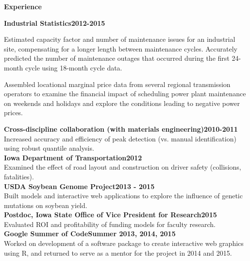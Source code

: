 \documentclass[letterpaper,12pt,final]{memoir}
\newcommand{\SmallSep}{\vspace{0.5em}}
\newcommand{\CVSection}[1]
	{\Large\textbf{#1}\par
	\SmallSep\normalsize\normalfont}
\newcommand{\CVItem}[1]
	{\textbf{\color{RoyalBlue} #1}}
\begin{document}
\CVSection{Experience}
\CVItem{Industrial Statistics\hfill 2012-2015}
\begin{compactitem}[\color{RoyalBlue}$\bullet$]\small
 \item Estimated capacity factor and number of maintenance issues for an industrial site, compensating for a longer length between maintenance cycles. Accurately predicted the number of maintenance outages that occurred during the first 24-month cycle using 18-month cycle data.
 \item Assembled locational marginal price data from several regional transmission operators to examine the financial impact of scheduling power plant maintenance on weekends and holidays and explore the conditions leading to negative power prices. 
\end{compactitem}\SmallSep
\CVItem{Cross-discipline collaboration (with materials engineering)\hfill 2010-2011}\\
{\small 
Increased accuracy and efficiency of peak detection (vs. manual identification) using robust quantile analysis.\SmallSep\\}
\CVItem{Iowa Department of Transportation\hfill 2012}\\
{\small Examined the effect of road layout and construction on driver safety (collisions, fatalities).\SmallSep\\}
\CVItem{USDA Soybean Genome Project\hfill 2013 - 2015}\\
{\small Built models and interactive web applications to explore the influence of genetic mutations on soybean yield.\SmallSep\\}
\CVItem{Postdoc, Iowa State Office of Vice President for Research\hfill 2015}\\
{\small Evaluated ROI and profitability of funding models for faculty research.\SmallSep\\}
\CVItem{Google Summer of Code\hfill Summer 2013, 2014, 2015}\\
{\small Worked on development of a software package to create interactive web graphics using R, and returned to serve as a mentor for the project in 2014 and 2015.}

\end{document}

